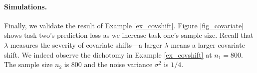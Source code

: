 \paragraph{Simulations.}
Finally, we validate the result of Example \ref{ex_covshift}.
Figure \ref{fig_covariate} shows task two's prediction loss as we increase task one's sample size.
Recall that $\lambda$ measures the severity of covariate shifts---a larger $\lambda$ means a larger covariate shift.
We indeed observe the dichotomy in Example \ref{ex_covshift} at $n_1 = 800$.
The sample size $n_2$ is $800$ and the noise variance $\sigma^2$ is $1/4$.






